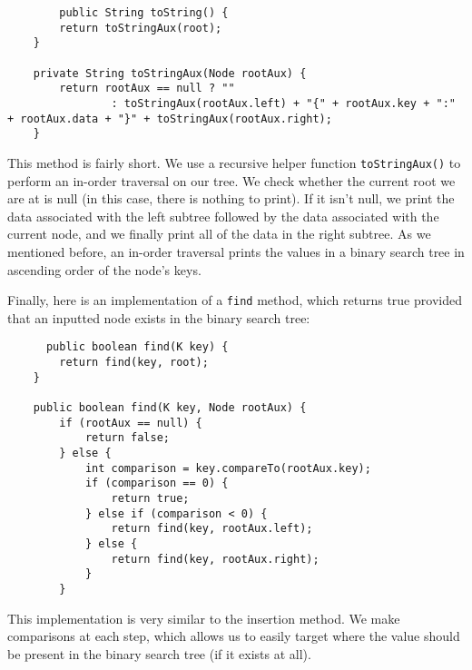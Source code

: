 \begin{lstlisting}
    	public String toString() {
		return toStringAux(root);
	}

	private String toStringAux(Node rootAux) {
		return rootAux == null ? ""
				: toStringAux(rootAux.left) + "{" + rootAux.key + ":" + rootAux.data + "}" + toStringAux(rootAux.right);
	}
\end{lstlisting}

This method is fairly short. We use a recursive helper function \verb!toStringAux()! to perform an in-order traversal on our tree. We check whether the current root we are at is null (in this case, there is nothing to print). If it isn't null, we print the data associated with the left subtree followed by the data associated with the current node, and we finally print all of the data in the right subtree. As we mentioned before, an in-order traversal prints the values in a binary search tree in ascending order of the node's keys.

Finally, here is an implementation of a \verb!find! method, which returns true provided that an inputted node exists in the binary search tree:

\begin{lstlisting}
      public boolean find(K key) {
		return find(key, root);
	}

	public boolean find(K key, Node rootAux) {
		if (rootAux == null) {
			return false;
		} else {
			int comparison = key.compareTo(rootAux.key);
			if (comparison == 0) {
				return true;
			} else if (comparison < 0) {
				return find(key, rootAux.left);
			} else {
				return find(key, rootAux.right);
			}
		}

\end{lstlisting}

This implementation is very similar to the insertion method. We make comparisons at each step, which allows us to easily target where the value should be present in the binary search tree (if it exists at all). 